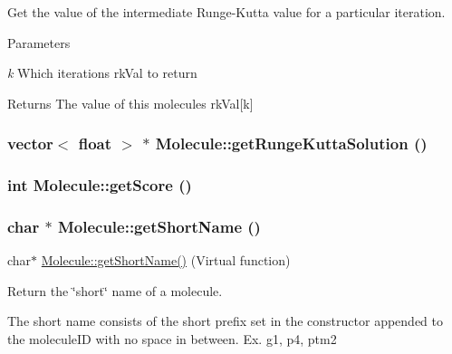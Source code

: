 Get the value of the intermediate Runge-\/Kutta value for a particular iteration.


\begin{DoxyParams}{Parameters}
\item[{\em k}]Which iterations rkVal to return\end{DoxyParams}
\begin{DoxyReturn}{Returns}
The value of this molecules rkVal\mbox{[}k\mbox{]} 
\end{DoxyReturn}
\hypertarget{classMolecule_a4405c3a17adfed340826d8b31e4da589}{
\subsubsection[{getRungeKuttaSolution}]{\setlength{\rightskip}{0pt plus 5cm}vector$<$ float $>$ $\ast$ Molecule::getRungeKuttaSolution ()}}
\label{classMolecule_a4405c3a17adfed340826d8b31e4da589}
\hypertarget{classMolecule_a125243e73faff1e5e482e65ba923ca3a}{
\subsubsection[{getScore}]{\setlength{\rightskip}{0pt plus 5cm}int Molecule::getScore ()}}
\label{classMolecule_a125243e73faff1e5e482e65ba923ca3a}
\hypertarget{classMolecule_a6d8720e89d81c1297beced997ad62718}{
\subsubsection[{getShortName}]{\setlength{\rightskip}{0pt plus 5cm}char $\ast$ Molecule::getShortName ()}}
\label{classMolecule_a6d8720e89d81c1297beced997ad62718}
char$\ast$ \hyperlink{classMolecule_a6d8720e89d81c1297beced997ad62718}{Molecule::getShortName()} (Virtual function)

Return the \char`\"{}short\char`\"{} name of a molecule.

The short name consists of the short prefix set in the constructor appended to the moleculeID with no space in between. Ex. g1, p4, ptm2

